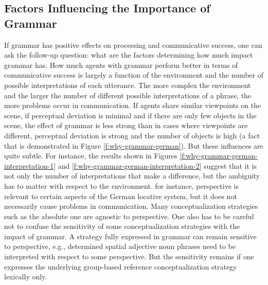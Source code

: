 \subsection{Factors Influencing the Importance of Grammar}
If grammar has positive effects on processing and communicative success, 
one can ask the follow-up question: what are the factors determining
how much impact grammar has. How much agents with 
grammar perform better in terms of communicative success is largely 
a function of the environment and the number of possible 
interpretations of each utterance. The more complex the environment 
and the larger the number of different possible interpretations of a phrase, 
the more problems occur in communication. If agents share similar viewpoints 
on the scene, if perceptual deviation is minimal and if there are only few objects 
in the scene, the effect of grammar is less strong 
than in cases where viewpoints are different, perceptual deviation is strong and the number of objects 
is high (a fact that is demonstrated in Figure \ref{f:why-grammar-german}). 
But these influences are quite subtle. For instance, the results shown in Figures
\ref{f:why-grammar-german-interpretation-1} and \ref{f:why-grammar-german-interpretation-2} suggest that it is not only the number of interpretations that make a difference, but the ambiguity has to matter with respect to the environment. for
instance, perspective is relevant to certain aspects of the German locative system,
but it does not necessarily cause problems in communication. Many conceptualization
strategies such as the absolute one are agnostic to perspective. One
also has to be careful not to confuse the sensitivity of some conceptualization strategies
with the impact of grammar. A strategy fully expressed in grammar can remain 
sensitive to perspective, e.g., determined spatial adjective noun phrases need to be 
interpreted with respect to some perspective. But the sensitivity remains if one expresses the
underlying group-based reference conceptualization strategy lexically only.

